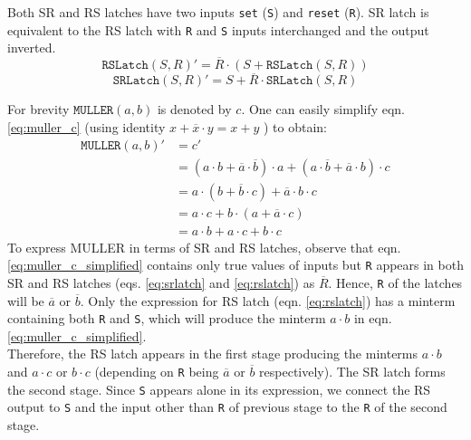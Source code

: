 Both SR and RS latches have two inputs \texttt{set} (\texttt{S}) and
\texttt{reset} (\texttt{R}). 
SR latch is equivalent to the RS latch with \texttt{R} and \texttt{S} inputs
interchanged and the output inverted.
\begin{equation}\label{eq:rslatch}
	\texttt{RSLatch}(S,R)' = \overline{R} \cdot (S + \texttt{RSLatch}(S,R))
\end{equation}
\begin{equation}\label{eq:srlatch}
	\texttt{SRLatch}(S,R)' = S + \overline{R} \cdot \texttt{SRLatch}(S,R)
\end{equation}

For brevity $\texttt{MULLER}(a,b)$ is denoted by $c$. 
 One can easily simplify eqn. \ref{eq:muller_c} (using identity $x + \overline{x}
 \cdot y = x + y$ ) to obtain:
\begin{equation}\label{eq:muller_c_simplified}
\begin{split}
	\texttt{MULLER}(a,b)' &= c'\\
	&= (a \cdot b + \overline{a} \cdot \overline{b}) \cdot a 
		+ (a \cdot \overline{b} + \overline{a} \cdot b) \cdot c \\
	&= a \cdot (b + \overline{b} \cdot c) + \overline{a} \cdot b \cdot c \\
	&= a \cdot c + b \cdot (a + \overline{a} \cdot c) \\
	&= a \cdot b + a \cdot c + b \cdot c
\end{split}
\end{equation}
To express MULLER in terms of SR and RS latches, 
observe that eqn. \ref{eq:muller_c_simplified} contains only true values of
inputs but \texttt{R} appears in both SR and RS latches (eqs. \ref{eq:srlatch}
and \ref{eq:rslatch}) as $\overline{R}$. 
Hence, \texttt{R} of the latches will be $\overline{a}$ or $\overline{b}$.
Only the expression for RS latch (eqn. \ref{eq:rslatch}) has a minterm containing both \texttt{R}
and \texttt{S}, which will produce the minterm $ a \cdot b $ in eqn. \ref{eq:muller_c_simplified}.
\\
Therefore, the RS latch appears in the first stage producing the minterms $a
\cdot b$ and $a \cdot c$ or $b \cdot c$ (depending on \texttt{R} being
$\overline{a}$ or $\overline{b}$ respectively). 
The SR latch forms the second stage.
Since \texttt{S} appears alone in its expression, we connect the RS output
to \texttt{S} and the input other than \texttt{R} of previous stage to the
\texttt{R} of the second stage.

